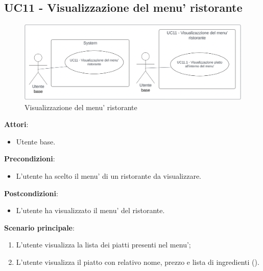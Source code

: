 \subsection{UC11 - Visualizzazione del menu' ristorante} \label{usecase:11}
\begin{figure}[H]
    \centering
    \includegraphics[width=0.9\linewidth]{ucd/UCD11_new.png}
\caption{Visualizzazione del menu' ristorante}
\end{figure}
\textbf{Attori}:
\begin{itemize}
    \item Utente base.
\end{itemize}
\textbf{Precondizioni}:
\begin{itemize}
    \item L'utente ha scelto il menu' di un ristorante da visualizzare.
\end{itemize}
\textbf{Postcondizioni}:
\begin{itemize}
    \item L'utente ha visualizzato il menu' del ristorante.
\end{itemize}
\textbf{Scenario principale}:
\begin{enumerate}
    \item L'utente visualizza la lista dei piatti presenti nel menu';
    \item L’utente visualizza il piatto con relativo nome, prezzo e lista di ingredienti ().
\end{enumerate}

